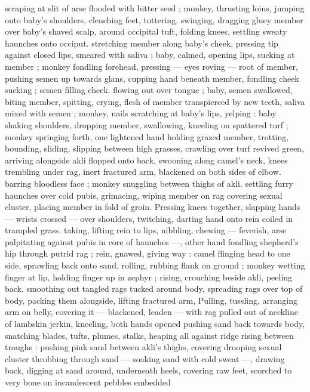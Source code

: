 scraping at slit of arse flooded with bitter seed ; monkey, thrusting 
loins, jumping onto baby's shoulders, clenching feet, tottering. 
swinging, dragging gluey member over baby's shaved scalp, around 
occipital tuft, folding knees, settling sweaty haunches onto occiput. 
stretching member along baby's cheek, pressing tip against closed 
lips, smeared with saliva ; baby, calmed, opening lips, sucking at 
member ; monkey fondling forehead, pressing --- eyes roving --- 
root of member, pushing semen up towards glans, cupping hand 
beneath member, fondling cheek sucking ; semen filling cheek. 
flowing out over tongue ; baby, semen swallowed, biting member, 
spitting, crying, flesh of member transpierced by new teeth, saliva 
mixed with semen ; monkey, nails scratching at baby's lips, yelping : 
baby shaking shoulders, dropping member, swallowing, kneeling on 
spattered turf ; monkey springing forth, one lightened hand holding 
grazed member, trotting, bounding, sliding, slipping between high 
grasses, crawling over turf revived green, arriving alongside akli 
flopped onto back, swooning along camel's neck, knees trembling 
under rag, inert fractured arm, blackened on both sides of elbow. 
barring bloodless face ; monkey snuggling between thighs of akli. 
settling furry haunches over cold pubis, grimacing, wiping member 
on rag covering sexual cluster, placing member in fold of groin. 
Pressing knees together, slapping hands --- wrists crossed --- over 
shoulders, twitching, darting hand onto rein coiled in trampled grass. 
taking, lifting rein to lips, nibbling, chewing --- feverish, arse 
palpitating against pubis in core of haunches ---, other hand 
fondling shepherd's hip through putrid rag ; rein, gnawed, giving way 
: camel flinging head to one side, sprawling back onto sand, rolling, 
rubbing flank on ground ; monkey wetting finger at lip, holding finger 
up in zephyr ; rising, crouching beside akli, peeling back. smoothing 
out tangled rags tucked around body, spreading rags over top of 
body, packing them alongside, lifting fractured arm, Pulling, tussling, 
arranging arm on belly, covering it --- blackened, leaden --- with rag 
pulled out of neckline of lambskin jerkin, kneeling, both hands 
opened pushing sand back towards body, snatching blades, tufts, 
plumes, stalks, heaping all against ridge rising between troughs : 
pushing pink sand between akli's thighs, covering drooping sexual 
cluster throbbing through sand --- soaking sand with cold sweat ---, 
drawing back, digging at sand around, underneath heels, covering 
raw feet, scorched to very bone on incandescent pebbles embedded 
